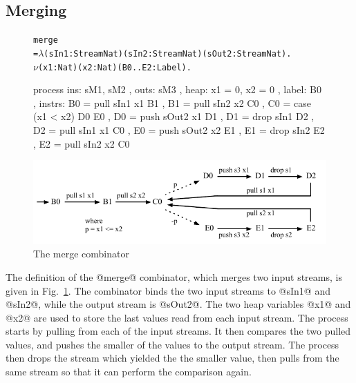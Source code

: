 \subsection{Merging}
\begin{figure}
\begin{alltt}
               merge
                 = \(\lambda\) (sIn1: Stream Nat) (sIn2: Stream Nat) (sOut2: Stream Nat). 
                   \(\nu\) (x1: Nat) (x2: Nat) (B0..E2: Label).
\end{alltt}
\begin{code}
                   process
                   { ins:    { sM1, sM2 }
                   , outs:   { sM3 }
                   , heap:   { x1 = 0, x2 = 0 }
                   , label:  B0
                   , instrs: { B0 = pull sIn1  x1   B1 {}
                             , B1 = pull sIn2  x2   C0 {}
                             , C0 = case (x1 < x2)  D0 {}  E0 {}
                             , D0 = push sOut2 x1   D1 {}
                             , D1 = drop sIn1       D2 {}
                             , D2 = pull sIn1  x1   C0 {}
                             , E0 = push sOut2 x2   E1 {}
                             , E1 = drop sIn2       E2 {}
                             , E2 = pull sIn2 x2    C0 {} } }
\end{code}

\medskip
\includegraphics[scale=1.1]{figures/state-merge.pdf}
\caption{The merge combinator}
\label{fig:Process:Merge}
\end{figure}

The definition of the @merge@ combinator, which merges two input streams, is given in Fig.~\ref{fig:Process:Merge}. The combinator binds the two input streams to @sIn1@ and @sIn2@, while the output stream is @sOut2@. The two heap variables @x1@ and @x2@ are used to store the last values read from each input stream. The process starts by pulling from each of the input streams. It then compares the two pulled values, and pushes the smaller of the values to the output stream. The process then drops the stream which yielded the the smaller value, then pulls from the same stream so that it can perform the comparison again.

